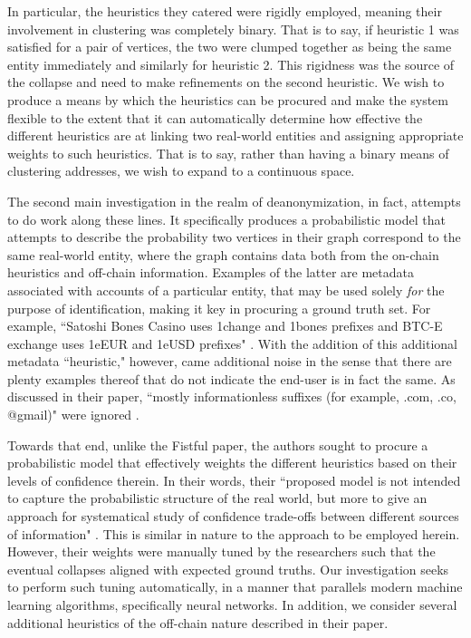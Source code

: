 \documentclass[journal]{IEEEtran}
\begin{document}
In particular, the heuristics they catered were rigidly employed, meaning their involvement in clustering was completely binary. That is to say, if heuristic 1 was satisfied for a pair of vertices, the two were clumped together as being the same entity immediately and similarly for heuristic 2. This rigidness was the source of the collapse and need to make refinements on the second heuristic. We wish to produce a means by which the heuristics can be procured and make the system flexible to the extent that it can automatically determine how effective the different heuristics are at linking two real-world entities and assigning appropriate weights to such heuristics. That is to say, rather than having a binary means of clustering addresses, we wish to expand to a continuous space. 

The second main investigation in the realm of deanonymization, in fact, attempts to do work along these lines. It specifically produces a probabilistic model that attempts to describe the probability two vertices in their graph correspond to the same real-world entity, where the graph contains data both from the on-chain heuristics and off-chain information. Examples of the latter are metadata associated with accounts of a particular entity, that may be used solely \textit{for} the purpose of identification, making it key in procuring a ground truth set. For example, ``Satoshi Bones Casino uses 1change and 1bones prefixes and BTC-E exchange uses 1eEUR and 1eUSD prefixes" \cite{automatic}. With the addition of this additional metadata ``heuristic," however, came additional noise in the sense that there are plenty examples thereof that do not indicate the end-user is in fact the same. As discussed in their paper, ``mostly informationless suffixes  (for example, .com, .co, @gmail)" were ignored \cite{automatic}. 

Towards that end, unlike the Fistful paper, the authors sought to procure a probabilistic model that effectively weights the different heuristics based on their levels of confidence therein. In their words, their ``proposed  model  is  not  intended  to  capture the probabilistic structure of the real world, but more to give an  approach  for  systematical  study  of  confidence  trade-offs between different sources of information" \cite{automatic}. This is similar in nature to the approach to be employed herein. However, their weights were manually tuned by the researchers such that the eventual collapses aligned with expected ground truths. Our investigation seeks to perform such tuning automatically, in a manner that parallels modern machine learning algorithms, specifically neural networks. In addition, we consider several additional heuristics of the off-chain nature described in their paper.
\end{document}

